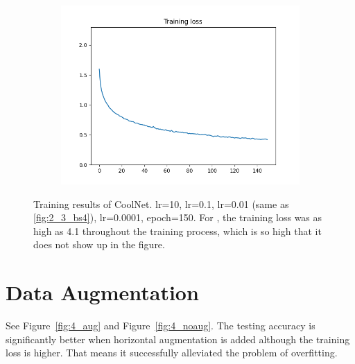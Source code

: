 \documentclass[12pt]{article}
\begin{document}
\begin{figure}
\begin{subfigure}{0.19\textwidth}
    \includegraphics[width=\linewidth]{loss_3_e150.png}
    \caption{}
    \label{fig:3_e150}
  \end{subfigure}
  \caption{Training results of CoolNet.  lr=10,  lr=0.1,  lr=0.01 (same as \ref{fig:2_3_bs4}),  lr=0.0001,  epoch=150. For , the training loss was as high as 4.1 throughout the training process, which is so high that it does not show up in the figure.}
  \label{fig:3}
\end{figure}

\section{Data Augmentation}
See Figure~\ref{fig:4_aug} and Figure~\ref{fig:4_noaug}. The testing accuracy is significantly better when horizontal augmentation is added although the training loss is higher. That means it successfully alleviated the problem of overfitting.
\end{document}
